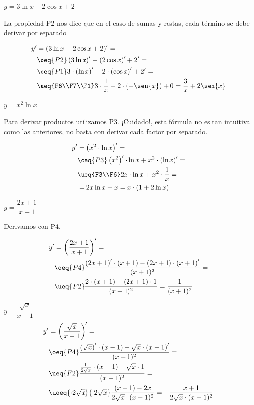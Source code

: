 \begin{ejemplo}
\quad $y=3\ln{x}-2\cos{x}+2$

La propiedad P2 nos dice que en el caso de sumas y restas, cada término se debe derivar por separado

\[\begin{aligned}
    y'&=\left(3\ln{x}-2\cos{x}+2\right)'=\\
        &\oeq{P2}\left(3\ln{x}\right)'-\left(2\cos{x}\right)'+2'=\\
        &\oeq{P1}3\cdot\left(\ln{x}\right)'-2\cdot\left(\cos{x}\right)'+2'=\\
        &\ueq{F6\\F7\\F1}3\cdot\frac1x-2\cdot\left(-\sen{x}\right)+0=\frac3x+2\sen{x}
\end{aligned}\]

\quad $y=x^2\ln{x}$

Para derivar productos utilizamos P3. ¡Cuidado!, esta fórmula no es tan intuitiva como las anteriores, no basta con derivar cada factor por separado.

\[\begin{aligned}
    y'&=\left(x^2\cdot\ln{x}\right)'=\\
        &\oeq{P3}\left(x^2\right)'\cdot\ln{x}+x^2\cdot\left(\ln{x}\right)'=\\
        &\ueq{F3\\F6}2x\cdot\ln{x}+x^2\cdot\frac1x=\\
        &=2x\ln{x}+x=x\cdot(1+2\ln{x})
\end{aligned}\]

\quad $y=\dfrac{2x+1}{x+1}$

Derivamos con P4.

\[\begin{aligned}
    y'&=\left(\frac{2x+1}{x+1}\right)'=\\
        &\oeq{P4}\dfrac{\left(2x+1\right)'\cdot(x+1)-(2x+1)\cdot\left(x+1\right)'}{(x+1)^2}=\\
        &\ueq{F2}\dfrac{2\cdot(x+1)-(2x+1)\cdot1}{(x+1)^2}=\dfrac1{(x+1)^2}
\end{aligned}\]

\quad $y=\dfrac{\sqrt{x}}{x-1}$
\[\begin{aligned}
    y'&=\left(\frac{\sqrt{x}}{x-1}\right)'=\\
        &\oeq{P4}\dfrac{\left(\sqrt{x}\right)'\cdot(x-1)-\sqrt{x}\cdot\left(x-1\right)'}{(x-1)^2}=\\
        &\ueq{F2}\dfrac{\frac1{2\sqrt{x}}\cdot(x-1)-\sqrt{x}\cdot1}{(x-1)^2}=\\
        &\uoeq{\cdot2\sqrt{x}}{\cdot2\sqrt{x}}\dfrac{(x-1)-2x}{2\sqrt{x}\cdot(x-1)^2}
            =-\frac{x+1}{2\sqrt{x}\cdot(x-1)^2}
\end{aligned}\]


\end{ejemplo}

